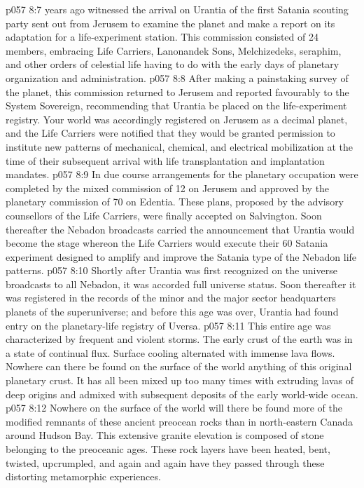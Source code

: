 \vs p057 8:7 \pc {} years ago witnessed the arrival on Urantia of the first Satania scouting party sent out from Jerusem to examine the planet and make a report on its adaptation for a life\hyp{}experiment station. This commission consisted of 24 members, embracing Life Carriers, Lanonandek Sons, Melchizedeks, seraphim, and other orders of celestial life having to do with the early days of planetary organization and administration.
\vs p057 8:8 After making a painstaking survey of the planet, this commission returned to Jerusem and reported favourably to the System Sovereign, recommending that Urantia be placed on the life\hyp{}experiment registry. Your world was accordingly registered on Jerusem as a decimal planet, and the Life Carriers were notified that they would be granted permission to institute new patterns of mechanical, chemical, and electrical mobilization at the time of their subsequent arrival with life transplantation and implantation mandates.
\vs p057 8:9 In due course arrangements for the planetary occupation were completed by the mixed commission of 12 on Jerusem and approved by the planetary commission of 70 on Edentia. These plans, proposed by the advisory counsellors of the Life Carriers, were finally accepted on Salvington. Soon thereafter the Nebadon broadcasts carried the announcement that Urantia would become the stage whereon the Life Carriers would execute their 60 Satania experiment designed to amplify and improve the Satania type of the Nebadon life patterns.
\vs p057 8:10 Shortly after Urantia was first recognized on the universe broadcasts to all Nebadon, it was accorded full universe status. Soon thereafter it was registered in the records of the minor and the major sector headquarters planets of the superuniverse; and before this age was over, Urantia had found entry on the planetary\hyp{}life registry of Uversa.
\vs p057 8:11 \pc This entire age was characterized by frequent and violent storms. The early crust of the earth was in a state of continual flux. Surface cooling alternated with immense lava flows. Nowhere can there be found on the surface of the world anything of this original planetary crust. It has all been mixed up too many times with extruding lavas of deep origins and admixed with subsequent deposits of the early world\hyp{}wide ocean.
\vs p057 8:12 Nowhere on the surface of the world will there be found more of the modified remnants of these ancient preocean rocks than in north\hyp{}eastern Canada around Hudson Bay. This extensive granite elevation is composed of stone belonging to the preoceanic ages. These rock layers have been heated, bent, twisted, upcrumpled, and again and again have they passed through these distorting metamorphic experiences.
